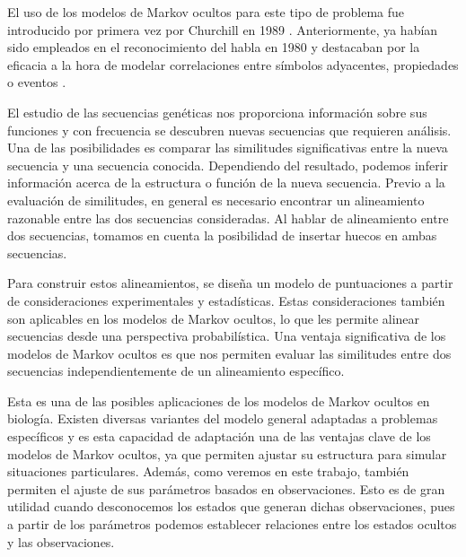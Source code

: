 El uso de los modelos de Markov ocultos para este tipo de problema fue introducido por primera vez por Churchill en 1989 \cite{Churchill}. Anteriormente, ya habían sido empleados en el reconocimiento del habla en 1980 \cite{Ferguson} y destacaban por la eficacia a la hora de modelar correlaciones entre símbolos adyacentes, propiedades o eventos \cite{Rabiner}. 

El estudio de las secuencias genéticas nos proporciona información sobre sus funciones y con frecuencia se descubren nuevas secuencias que requieren análisis. Una de las posibilidades es comparar las similitudes significativas entre la nueva secuencia y una secuencia conocida. Dependiendo del resultado, podemos inferir información acerca de la estructura o función de la nueva secuencia. Previo a la evaluación de similitudes, en general es necesario encontrar un alineamiento razonable entre las dos secuencias consideradas. Al hablar de alineamiento entre dos secuencias, tomamos en cuenta la posibilidad de insertar huecos en ambas secuencias. 

\iffalse
Supongamos que tenemos dos secuencias de ADN: 
\[x=TACGAACTG \qquad y=TCGTAACGTA\]
Un alineamiento razonable podría ser el siguiente:
\[\begin{array}{c c c c c c c c c c c}
    T& A& C& G& -& A& A& C& -& T& G \\
    T& -& C& G& T& A& A& C& G& T& A
\end{array}\]
podemos observar que, al insertar huecos en las secuencias, logramos alinear símbolos iguales en ambas secuencias.\fi

Para construir estos alineamientos, se diseña un modelo de puntuaciones a partir de consideraciones experimentales y estadísticas. Estas consideraciones también son aplicables en los modelos de Markov ocultos, lo que les permite alinear secuencias desde una perspectiva probabilística. Una ventaja significativa de los modelos de Markov ocultos es que nos permiten evaluar las similitudes entre dos secuencias independientemente de un alineamiento específico.

Esta es una de las posibles aplicaciones de los modelos de Markov ocultos en biología. Existen diversas variantes del modelo general adaptadas a problemas específicos y es esta capacidad de adaptación una de las ventajas clave de los modelos de Markov ocultos, ya que permiten ajustar su estructura para simular situaciones particulares. Además, como veremos en este trabajo, también permiten el ajuste de sus parámetros basados en observaciones. Esto es de gran utilidad cuando desconocemos los estados que generan dichas observaciones, pues a partir de los parámetros podemos establecer relaciones entre los estados ocultos y las observaciones.

